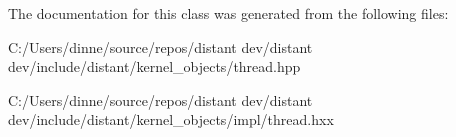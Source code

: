 The documentation for this class was generated from the following files\+:\begin{DoxyCompactItemize}
\item 
C\+:/\+Users/dinne/source/repos/distant dev/distant dev/include/distant/kernel\+\_\+objects/thread.\+hpp\item 
C\+:/\+Users/dinne/source/repos/distant dev/distant dev/include/distant/kernel\+\_\+objects/impl/thread.\+hxx\end{DoxyCompactItemize}
